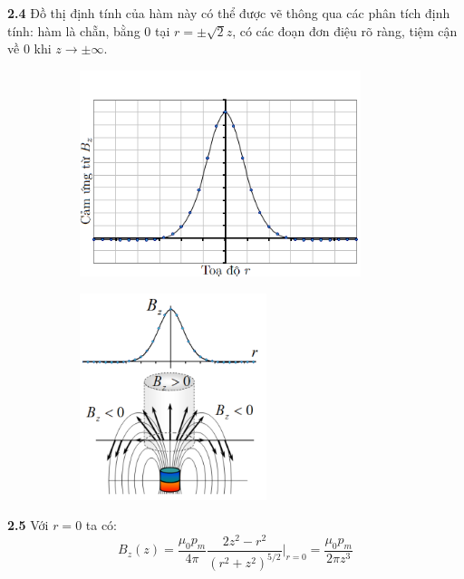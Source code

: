 \noindent\textbf{2.4} Đồ thị định tính của hàm này có thể được vẽ thông qua các phân tích định tính: hàm là chẵn, bằng 0 tại $r = \pm \sqrt{2}z$, có các đoạn đơn điệu rõ ràng, tiệm cận về 0 khi $z \to \pm\infty$.\\
\begin{figure}[H]
  \centering
  \begin{subfigure}[b]{0.49\textwidth}
    \centering
    \includegraphics[width=0.9\textwidth]{Figures/Solutions/Fig 2.3.png}
  \end{subfigure}
  \hfill
  \begin{subfigure}[b]{0.49\textwidth}
    \centering
    \includegraphics[width=0.6\textwidth]{Figures/Solutions/Fig 2.4.png}
  \end{subfigure}
\end{figure}


\noindent\textbf{2.5} Với $r = 0$ ta có:
\begin{equation*}
  B_z(z) = \frac{\mu_0 p_m}{4\pi} \frac{2z^2 - r^2}{(r^2 + z^2)^{5/2}} \Big|_{r = 0} = \frac{\mu_0 p_m}{2\pi z^3}
\end{equation*}

